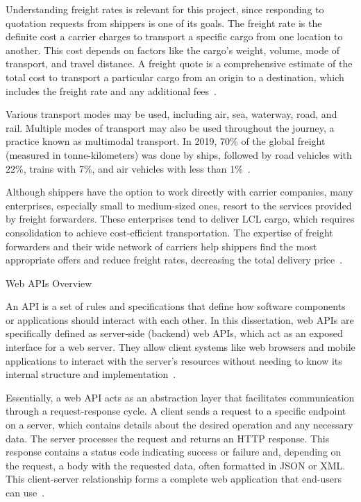 \documentclass[12pt, reqno]{amsbook}
\makeatletter
\def\section{\@startsection{section}{1}%
      \z@{.5\linespacing\@plus.7\linespacing}{.25\linespacing}%
      {\normalfont\bfseries\flushleft}}
\theoremstyle{definition}
\theoremstyle{definition}
\numberwithin{section}{chapter}
\numberwithin{table}{chapter}
\numberwithin{figure}{chapter}
\makeatother
\begin{document}
Understanding freight rates is relevant for this project, since responding to quotation requests from shippers is one of its goals. The freight rate is the definite cost a carrier charges to transport a specific cargo from one location to another. This cost depends on factors like the cargo's weight, volume, mode of transport, and travel distance. A freight quote is a comprehensive estimate of the total cost to transport a particular cargo from an origin to a destination, which includes the freight rate and any additional fees~\cite{Song2021, Mairon_Freight, Wang2021, WebCargo}.

Various transport modes may be used, including air, sea, waterway, road, and rail. Multiple modes of transport may also be used throughout the journey, a practice known as multimodal transport. In 2019, 70\% of the global freight (measured in tonne-kilometers) was done by ships, followed by road vehicles with 22\%, trains with 7\%, and air vehicles with less than 1\%~\cite{ITF2023}.

Although shippers have the option to work directly with carrier companies, many enterprises, especially small to medium-sized ones, resort to the services provided by freight forwarders. These enterprises tend to deliver \ac{LCL} cargo, which requires consolidation to achieve cost-efficient transportation. The expertise of freight forwarders and their wide network of carriers help shippers find the most appropriate offers and reduce freight rates, decreasing the total delivery price~\cite{Huang2019}.


\section{Web \texorpdfstring{\acp{API}}{API} Overview}
\label{Section:Web_API_Overview}

An \ac{API} is a set of rules and specifications that define how software components or applications should interact with each other. In this dissertation, web \acp{API} are specifically defined as server-side (backend) web \acp{API}, which act as an exposed interface for a web server. They allow client systems like web browsers and mobile applications to interact with the server's resources without needing to know its internal structure and implementation~\cite{Jin2018,Neumann2021, Khozaimi2022}.

Essentially, a web \ac{API} acts as an abstraction layer that facilitates communication through a request-response cycle. A client sends a request to a specific endpoint on a server, which contains details about the desired operation and any necessary data. The server processes the request and returns an \ac{HTTP} response. This response contains a status code indicating success or failure and, depending on the request, a body with the requested data, often formatted in \ac{JSON} or \ac{XML}. This client-server relationship forms a complete web application that end-users can use~\cite{Jin2018,Neumann2021, Khozaimi2022}.
\end{document}
